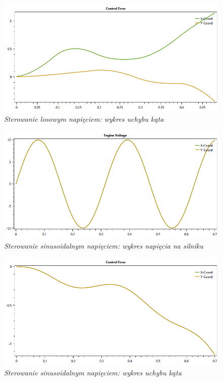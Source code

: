 \documentclass[12pt, oneside]{report}
\theoremstyle{definition}
\begin{document}
\begin{figure}[H]
	\centering
		\includegraphics[width = 350pt]{RandomCE} 
		\caption{\textit{Sterowanie losowym napięciem: wykres uchybu kąta}}
		\label{plot:RandomCE}
\end{figure}

\begin{figure}[H]
	\centering
		\includegraphics[width = 350pt]{SinusoidalEV} 
		\caption{\textit{Sterowanie sinusoidalnym napięciem: wykres napięcia na silniku}}
		\label{plot:SinusoidalEV}
\end{figure}

\begin{figure}[H]
	\centering
		\includegraphics[width = 350pt]{SinusoidalCE} 
		\caption{\textit{Sterowanie sinusoidalnym napięciem: wykres uchybu kąta}}
		\label{plot:SinusoidalCE}
\end{figure}
\end{document}

